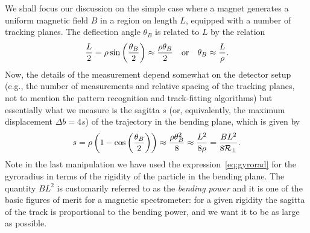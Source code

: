 We shall focus our discussion on the simple case where a magnet generates a
uniform magnetic field $B$ in a region on length $L$, equipped with a number of
tracking planes. The deflection angle $\theta_B$ is related
to $L$ by the relation
\begin{align*}
  \frac{L}{2} = \rho \sin\left(\frac{\theta_B}{2}\right) \approx
  \frac{\rho \theta_B}{2} \quad\text{or}\quad
  \theta_B \approx \frac{L}{\rho}.
\end{align*}
Now, the details of the measurement depend somewhat on the detector setup (e.g.,
the number of measurements and relative spacing of the tracking planes, not to
mention the pattern recognition and track-fitting algorithms) but essentially what
we measure is the sagitta $s$ (or, equivalently, the maximum displacement
$\Delta b = 4s$) of the trajectory in the bending plane, which is given by
\begin{align*}
  s = \rho \left(1 - \cos\left(\frac{\theta_B}{2}\right)\right) \approx
  \frac{\rho \theta_B^2}{8} \approx \frac{L^2}{8\rho} =
  \frac{B L^2}{8 \mathcal{R}_\perp}.
\end{align*}
Note in the last manipulation we have used the expression~\ref{eq:gyrorad} for the
gyroradius in terms of the rigidity of the particle in the bending plane.
The quantity $B L^2$ is customarily referred to as the \emph{bending power} and it
is one of the basic figures of merit for a magnetic spectrometer: for a given
rigidity the sagitta of the track is proportional to the bending power, and
we want it to be as large as possible.

